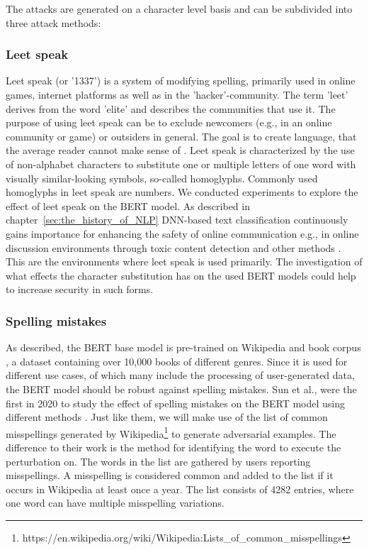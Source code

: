 The attacks are generated on a character level basis and can be subdivided into three attack methods:


\subsubsection{Leet speak}
Leet speak (or '1337') is a system of modifying spelling, primarily used in online games, internet platforms as well as in the 'hacker'-community. The term 'leet' derives from the word 'elite' and describes the communities that use it. The purpose of using leet speak can be to exclude newcomers (e.g., in an online community or game) or outsiders in general. The goal is to create language, that the average reader cannot make sense of \cite{thomas2002hacker}.   
Leet speak is characterized by the use of non-alphabet characters to substitute one or multiple letters of one word with visually similar-looking symbols, so-called homoglyphs. Commonly used homoglyphs in leet speak are numbers. 
We conducted experiments to explore the effect of leet speak on the BERT model. As described in chapter~\ref{sec:the_history_of_NLP} DNN-based text classification continuously gains importance for enhancing the safety of online communication e.g., in online discussion environments through toxic content detection and other methods \cite{kumar2011natural}. This are the environments where leet speak is used primarily. The investigation of what effects the character substitution has on the used BERT models could help to increase security in such forms. 

\subsubsection{Spelling mistakes}
As described, the BERT base model is pre-trained on Wikipedia and book corpus \cite{zhu2015aligning}, a dataset containing over 10,000 books of different genres. Since it is used for different use cases, of which many include the processing of user-generated data, the BERT model should be robust against spelling mistakes. Sun et al., were the first in 2020 to study the effect of spelling mistakes on the BERT model using different methods \cite{sun2020adv}. Just like them, we will make use of the list of common misspellings generated by Wikipedia\footnote{https://en.wikipedia.org/wiki/Wikipedia:Lists_of_common_misspellings} to generate adversarial examples. The difference to their work is the method for identifying the word to execute the perturbation on. 
The words in the list are gathered by users reporting misspellings. A misspelling is considered common and added to the list if it occurs in Wikipedia at least once a year.
The list consists of 4282 entries, where one word can have multiple misspelling variations. 

